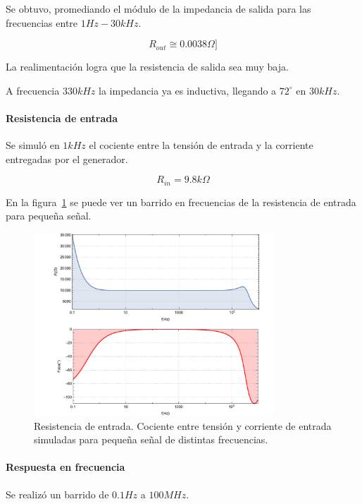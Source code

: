 \documentclass[a4paper,12pt,twoside]{article}
\begin{document}
Se obtuvo, promediando el módulo de la impedancia de salida para las frecuencias entre $1Hz-30kHz$.

\[R_{out}\cong 0.0038\Omega]\]

La realimentación logra que la resistencia de salida sea muy baja.

A frecuencia $330kHz$ la impedancia ya es inductiva, llegando a $72^\circ$ en $30kHz$.


\paragraph{Resistencia de entrada}

Se simuló en $1kHz$ el cociente entre la tensión de entrada y la corriente entregadas por el generador.

\[R_{in}=9.8k\Omega\]

En la figura~\ref{fig:R_i} se puede ver un barrido en frecuencias de la resistencia de entrada para pequeña señal.


\begin{figure}[H]
	\centering
	\includegraphics[width=0.8\textwidth]{img/sim/R_i}
	\caption{Resistencia de entrada. Cociente entre tensión y corriente de entrada simuladas para pequeña señal de distintas frecuencias.}
	\label{fig:R_i}
\end{figure}



\paragraph{Respuesta en frecuencia} 

Se realizó un barrido de $0.1Hz$ a $100MHz$.
\end{document}
